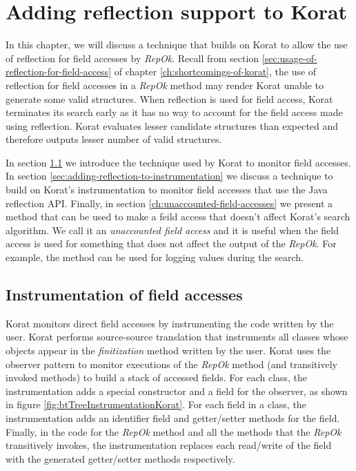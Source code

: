 \chapter{Adding reflection support to Korat}
\label{ch:adding-reflection}
In this chapter, we will discuss a technique that builds on Korat to
allow the use of reflection for field accesses by \emph{RepOk}. Recall
from section \ref{sec:usage-of-reflection-for-field-access} of chapter
\ref{ch:shortcomings-of-korat}, the use of reflection for field
accesses in a \emph{RepOk} method may render Korat unable to generate
some valid structures. When reflection is used for field access, Korat
terminates its search early as it has no way to account for the field
access made using reflection. Korat evaluates lesser candidate
structures than expected and therefore outputs lesser number of valid
structures.

\para In section \ref{sec:instrumentation-of-field-accesses} we
introduce the technique used by Korat to monitor field accesses. In
section \ref{sec:adding-reflection-to-instrumentation} we discuss a
technique to build on Korat's instrumentation to monitor field
accesses that use the Java reflection API. Finally, in section
\ref{ch:unaccounted-field-accesses} we present a method that can be
used to make a feild access that doesn't affect Korat's search
algorithm. We call it an \emph{unaccounted field access} and it is
useful when the field access is used for something that does not
affect the output of the \emph{RepOk}. For example, the method can be
used for logging values during the search.


\section{Instrumentation of field accesses}
\label{sec:instrumentation-of-field-accesses}
Korat monitors direct field accesses by instrumenting the code written
by the user. Korat performs source-source translation that instruments
all classes whose objects appear in the \emph{finitization} method
written by the user. Korat uses the observer pattern
\cite{gamma1994design} to monitor executions of the \emph{RepOk}
method (and transitively invoked methods) to build a stack of accessed
fields. For each class, the instrumentation adds a special constructor
and a field for the observer, as shown in figure
\ref{fig:btTreeInstrumentationKorat}. For each field in a class, the
instrumentation adds an identifier field and getter/setter methods for
the field. Finally, in the code for the \emph{RepOk} method and all
the methods that the \emph{RepOk} transitively invokes, the
instrumentation replaces each read/write of the field with the
generated getter/setter methods respectively.


